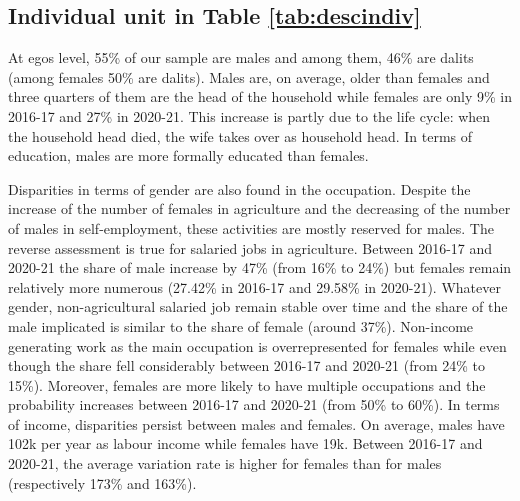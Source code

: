 \documentclass[a4paper, 12pt, onecolumn]{article}
\begin{document}

	\subsection{Individual unit in Table \ref{tab:descindiv}}

At egos level, 55\% of our sample are males and among them, 46\% are dalits (among females 50\% are dalits).
Males are, on average, older than females and three quarters of them are the head of the household while females are only 9\% in 2016-17 and 27\% in 2020-21.
This increase is partly due to the life cycle: when the household head died, the wife takes over as household head.
In terms of education, males are more formally educated than females.

Disparities in terms of gender are also found in the occupation.
Despite the increase of the number of females in agriculture and the decreasing of the number of males in self-employment, these activities are mostly reserved for males.
The reverse assessment is true for salaried jobs in agriculture.
Between 2016-17 and 2020-21 the share of male increase by 47\% (from 16\% to 24\%) but females remain relatively more numerous (27.42\% in 2016-17 and 29.58\% in 2020-21). 
Whatever gender, non-agricultural salaried job remain stable over time and the share of the male implicated is similar to the share of female (around 37\%).
Non-income generating work as the main occupation is overrepresented for females while even though the share fell considerably between 2016-17 and 2020-21 (from 24\% to 15\%).
Moreover, females are more likely to have multiple occupations and the probability increases between 2016-17 and 2020-21 (from 50\% to 60\%).
In terms of income, disparities persist between males and females.
On average, males have \rupee102k per year as labour income while females have \rupee19k.
Between 2016-17 and 2020-21, the average variation rate is higher for females than for males (respectively 173\% and 163\%).
\end{document}
